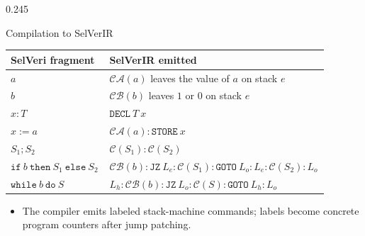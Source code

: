 \documentclass[final]{beamer}
\begin{document}
\begin{frame}[t,fragile]
\begin{columns}[t,totalwidth=\textwidth]
\begin{column}{0.245\textwidth}
\begin{posterbox}[height=21.7cm,compactboxtitle]{Compilation to SelVerIR}
{\vspace{0.05cm}
\begin{center}
\renewcommand{\arraystretch}{1.04}
\begin{tabular}{p{0.31\linewidth}p{0.58\linewidth}}
\textbf{SelVeri fragment} & \textbf{SelVerIR emitted} \\
\hline
$a$ & $\mathcal{CA}(a)$ leaves the value of $a$ on stack $e$ \\
$b$ & $\mathcal{CB}(b)$ leaves $1$ or $0$ on stack $e$ \\
$x:T$ & $\mathtt{DECL}\ T\ x$ \\
$x:=a$ & $\mathcal{CA}(a):\mathtt{STORE}\ x$ \\
$S_1;S_2$ & $\mathcal{C}(S_1):\mathcal{C}(S_2)$ \\
$\mathtt{if}\ b\ \mathtt{then}\ S_1\ \mathtt{else}\ S_2$ &
$\mathcal{CB}(b):\mathtt{JZ}\ L_e:\mathcal{C}(S_1):\mathtt{GOTO}\ L_o:L_e:\mathcal{C}(S_2):L_o$ \\
$\mathtt{while}\ b\ \mathtt{do}\ S$ &
$L_h:\mathcal{CB}(b):\mathtt{JZ}\ L_o:\mathcal{C}(S):\mathtt{GOTO}\ L_h:L_o$
\end{tabular}
\end{center}

\vspace{0.05cm}
\begin{itemize}
  \item The compiler emits labeled stack-machine commands; labels become concrete program counters after jump patching.
\end{itemize}

}
\end{posterbox}
\end{column}
\end{columns}
\end{frame}
\end{document}
